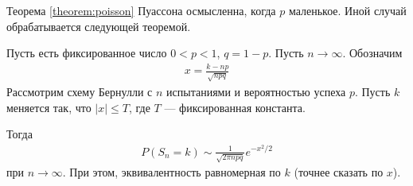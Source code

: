 Теорема \ref{theorem:poisson} Пуассона осмысленна, когда $p$ маленькое. Иной случай обрабатывается следующей теоремой.
\begin{thm}
 \label{theorem:local_theorem_muavr_laplas}
 Пусть есть фиксированное число $0 < p < 1$, $q = 1 - p$. Пусть $n \to \infty$. Обозначим
 \begin{align*}
  x =\frac{k - np}{\sqrt{npq}}
 \end{align*} Рассмотрим схему Бернулли с $n$ испытаниями и вероятностью успеха $p$.  Пусть $k$ меняется так, что $\left| x \right| \leqslant T$, где $T$ --- фиксированная константа.

 Тогда
 \begin{align*}
  P(S_n = k) \sim \frac{1}{\sqrt{2\pi npq }}e^{-x^{2} / 2}
 \end{align*} при $n \to \infty$. При этом, эквивалентность равномерная по $k$ (точнее сказать по $x$). 
\end{thm}
